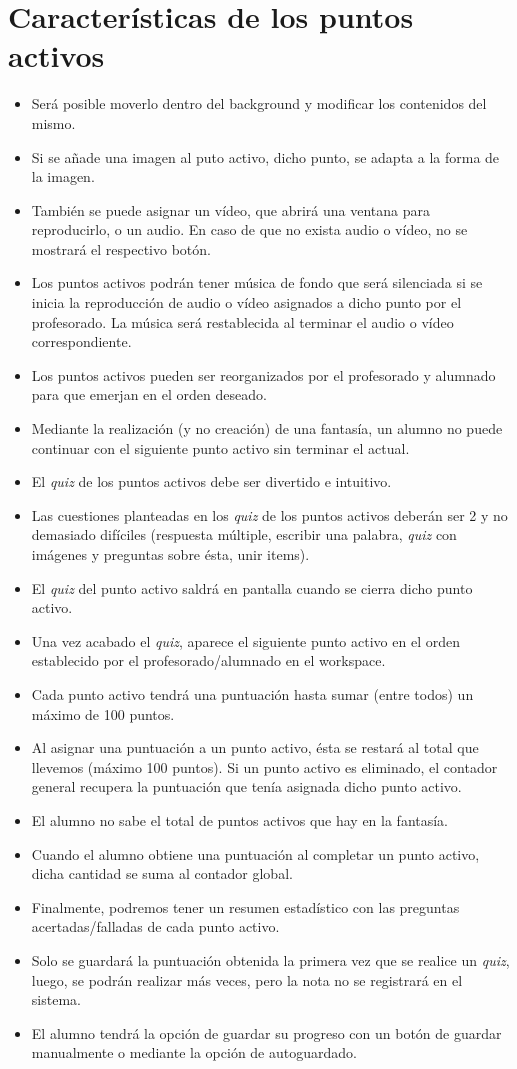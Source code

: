 \section{Características de los puntos activos}
\begin{itemize}
	\item Será posible moverlo dentro del background y modificar los contenidos del mismo.
	\item Si se añade una imagen al puto activo, dicho punto, se adapta a la forma de la imagen.
	\item También se puede asignar un vídeo, que abrirá una ventana para reproducirlo, o un audio. En caso de que no exista audio o vídeo, no se mostrará el respectivo botón.
	\item Los puntos activos podrán tener música de fondo que será silenciada si se inicia la reproducción de audio o vídeo asignados a dicho punto por el profesorado. La música será restablecida al terminar el audio o vídeo correspondiente.
	\item Los puntos activos pueden ser reorganizados por el profesorado y alumnado para que emerjan en el orden deseado.
	\item Mediante la realización (y no creación) de una fantasía, un alumno no puede continuar con el siguiente punto activo sin terminar el actual.
	\item El \textit{quiz} de los puntos activos debe ser divertido e intuitivo.
	\item Las cuestiones planteadas en los \textit{quiz} de los puntos activos deberán ser 2 y no demasiado difíciles (respuesta múltiple, escribir una palabra, \textit{quiz} con imágenes y preguntas sobre ésta, unir items).
	\item El \textit{quiz} del punto activo saldrá en pantalla cuando se cierra dicho punto activo.
	\item Una vez acabado el \textit{quiz}, aparece el siguiente punto activo en el orden establecido por el profesorado/alumnado en el workspace.
	\item Cada punto activo tendrá una puntuación hasta sumar (entre todos) un máximo de 100 puntos.
	\item Al asignar una puntuación a un punto activo, ésta se restará al total que llevemos (máximo 100 puntos). Si un punto activo es eliminado, el contador general recupera la puntuación que tenía asignada dicho punto activo.
	\item El alumno no sabe el total de puntos activos que hay en la fantasía.
	\item Cuando el alumno obtiene una puntuación al completar un punto activo, dicha cantidad se suma al contador global.
	\item Finalmente, podremos tener un resumen estadístico con las preguntas acertadas/falladas de cada punto activo.
	\item Solo se guardará la puntuación obtenida la primera vez que se realice un \textit{quiz}, luego, se podrán realizar más veces, pero la nota no se registrará en el sistema.
	\item El alumno tendrá la opción de guardar su progreso con un botón de guardar manualmente o mediante la opción de autoguardado.
\end{itemize}